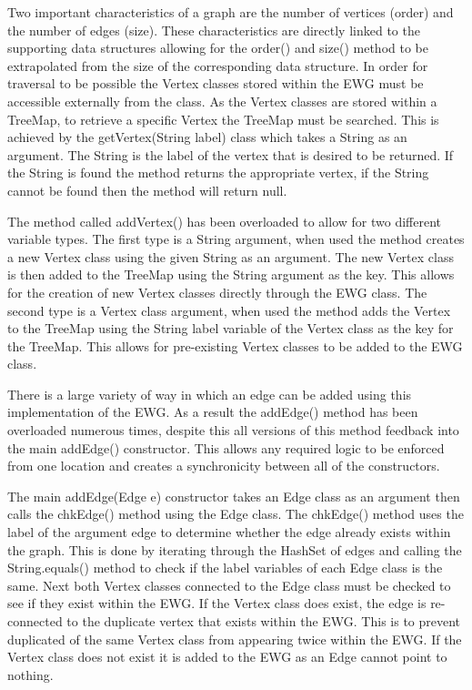 \documentclass{AISB2008}
\begin{document}
Two important characteristics of a graph are the number of vertices (order) and the number of edges (size). These characteristics are directly linked to the supporting data structures allowing for the order() and size() method to be extrapolated from the size of the corresponding data structure.
In order for traversal to be possible the Vertex classes stored within the EWG must be accessible externally from the class. As the Vertex classes are stored within a TreeMap, to retrieve a specific Vertex the TreeMap must be searched. This is achieved by the getVertex(String label) class which takes a String as an argument. The String is the label of the vertex that is desired to be returned. If the String is found the method returns the appropriate vertex, if the String cannot be found then the method will return null.

The method called addVertex() has been overloaded to allow for two different variable types. The first type is a String argument, when used the method creates a new Vertex class using the given String as an argument. The new Vertex class is then added to the TreeMap using the String argument as the key. This allows for the creation of new Vertex classes directly through the EWG class. The second type is a Vertex class argument, when used the method adds the Vertex to the TreeMap using the String label variable of the Vertex class as the key for the TreeMap. This allows for pre-existing Vertex classes to be added to the EWG class.

There is a large variety of way in which an edge can be added using this implementation of the EWG. As a result the addEdge() method has been overloaded numerous times, despite this all versions of this method feedback into the main addEdge() constructor. This allows any required logic to be enforced from one location and creates a synchronicity between all of the constructors.

The main addEdge(Edge e) constructor takes an Edge class as an argument then calls the chkEdge() method using the Edge class. The chkEdge() method uses the label of the argument edge to determine whether the edge already exists within the graph. This is done by iterating through the HashSet of edges and calling the String.equals() method to check if the label variables of each Edge class is the same. Next both Vertex classes connected to the Edge class must be checked to see if they exist within the EWG. If the Vertex class does exist, the edge is re-connected to the duplicate vertex that exists within the EWG. This is to prevent duplicated of the same Vertex class from appearing twice within the EWG. If the Vertex class does not exist it is added to the EWG as an Edge cannot point to nothing.
\end{document}
